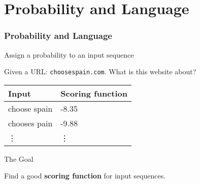




\begin{comment}
\begin{frame}
\frametitle{Announcements}
\centering
\begin{block}{Office Hours}
\smallskip
\begin{tabular}{lll}
 & Time & Location \\
\hline
Angel Chang & Fri 10:30-11:30am & TASC 8031 \\
Yasaman Etesam & Mon 2-3pm & ASB 9808 \\
            & this Fri 3:30-4:30 pm & \\
Ali Gholami & Tue 1-2 pm & ASB 9808 \\
Roya Javadi & Thu 9:30-10:30 am & ASB 9808
\end{tabular}
\end{block}

\begin{block}{Assignments}
HW0 due this Thursday
\end{block}
\end{frame}
\end{comment}

\section{Probability and Language}
\frame{\tableofcontents[currentsection]}

\begin{frame}
\frametitle{Probability and Language}
\centering
\begin{block}{Assign a probability to an input sequence}
\par Given a URL: \texttt{choosespain.com}. What is this website about?

\pause
\smallskip
\begin{tabular}{ll}
\rowcolor{MidnightBlue!50}
Input & Scoring function \\
\hline
choose spain & -8.35 \\
chooses pain & -9.88 \\
\vdots & \vdots
\end{tabular}
\end{block}

\pause
\begin{alertblock}{The Goal}
\par Find a good \textbf{scoring function} for input sequences.
\end{alertblock}
\end{frame}

